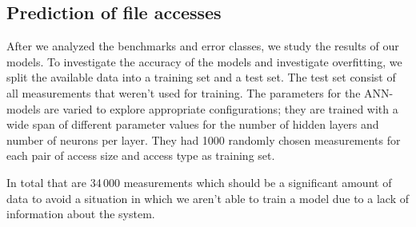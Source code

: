 \documentclass{superfri}
\begin{document}
\subsection{Prediction of file accesses}
After we analyzed the benchmarks and error classes, we study the results of our models.
To investigate the accuracy of the models and investigate overfitting, we split the available data into a training set and a test set. 
The test set consist of all measurements that weren't used for training.
The parameters for the ANN-models are varied to explore appropriate configurations; they are trained with a wide span of different parameter values for the number of hidden layers and number of neurons per layer.
They had 1000 randomly chosen measurements for each pair of access size and access type as training set. %
%

In total that are 34\,000 measurements which should be a significant amount of data to avoid a situation in which we aren't able to train a model due to a lack of information about the system. 

\medskip
\end{document}

